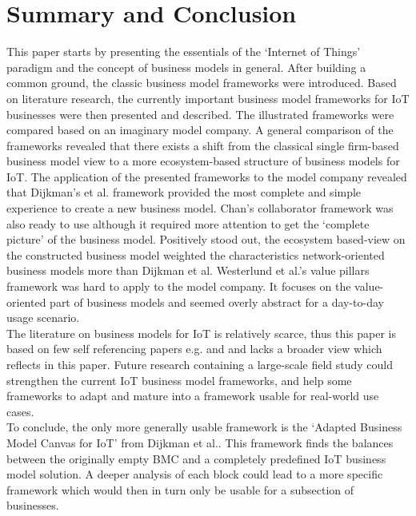 \section{Summary and Conclusion}
\vspace{-1em}
\label{sec:summary}
	This paper starts by presenting the essentials of the `Internet of Things' paradigm and the concept of business models in general. After building a common ground, the classic business model frameworks were introduced. Based on literature research, the currently important business model frameworks for IoT businesses were then presented and described. The illustrated frameworks were compared based on an imaginary model company. A general comparison of the frameworks revealed that there exists a shift from the classical single firm-based business model view to a more ecosystem-based structure of business models for IoT. The application of the presented frameworks to the model company revealed that Dijkman's et al. framework provided the most complete and simple experience to create a new business model. Chan's collaborator framework was also ready to use although it required more attention to get the `complete picture' of the business model. Positively stood out, the ecosystem based-view on the constructed business model weighted the characteristics network-oriented business models more than Dijkman et al. Westerlund et al.'s value pillars framework was hard to apply to the model company. It focuses on the value-oriented part of business models and seemed overly abstract for a day-to-day usage scenario.\\
	The literature on business models for IoT is relatively scarce, thus this paper is based on few self referencing papers e.g. \cite{ju} and \cite{dijkman} and lacks a broader view which reflects in this paper. Future research containing a large-scale field study could strengthen the current IoT business model frameworks, and help some frameworks to adapt and mature into a framework usable for real-world use cases.\\
	To conclude, the only more generally usable framework is the `Adapted Business Model Canvas for IoT' from Dijkman et al.. This framework finds the balances between the originally empty BMC and a completely predefined IoT business model solution. A deeper analysis of each block could lead to a more specific framework which would then in turn only be usable for a subsection of businesses.
	\vspace{-10em}
